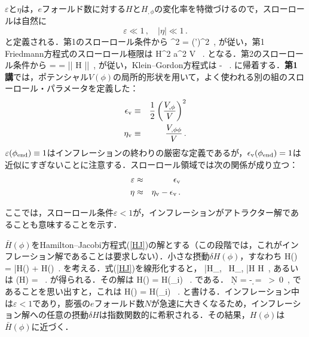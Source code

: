$\varepsilon$と$\eta$は，$e$フォールド数に対する$H$と$H_{,\phi}$の変化率を特徴づけるので，スローロールは自然に
\begin{equation}
\varepsilon \ll 1\, , \quad 
|\eta| \ll 1 \, .
\end{equation}
と定義される．第1のスローロール条件から
\beq
\varepsilon {} \qquad \Rightarrow {}^2 =   \gg (\phi')^2\, ,
\eeq
が従い，第1 Friedmann方程式のスローロール極限は
\beq
{\cal H}^2 \approx {} a^2 V \, .
\eeq
となる．第2のスローロール条件から
\beq
\eta = \frac{d \ln |\dot\phi|]}{d N} =    \quad \quad \Rightarrow \quad \quad |\ddot \phi | \ll H |\dot \phi |\, ,
\eeq
が従い，Klein--Gordon方程式は
\beq
\dot{\phi} \approx - \, .
\eeq
に帰着する．\textbf{第1講}では，ポテンシャル$V(\phi)$の局所的形状を用いて，よく使われる別の組のスローロール・パラメータを定義した：
\begin{eqnarray}
\epsilon_{\rm v} &\equiv& \frac{1}{2} \left(\frac{V_{,\phi}}{V}\right)^2\\
\eta_{\rm v} &\equiv& \frac{V_{,\phi \phi}}{V}\, .
\end{eqnarray}
$\varepsilon(\phi_{\rm end}) \equiv 1$はインフレーションの終わりの厳密な定義であるが，$\epsilon_{\rm v}(\phi_{\rm end}) =1$は近似にすぎないことに注意する．スローロール領域では次の関係が成り立つ：
\begin{eqnarray}
\varepsilon &\approx& \epsilon_{\rm v} \\
\eta &\approx& \eta_{\rm v} - \epsilon_{\rm v}\, .
\end{eqnarray}





ここでは，スローロール条件$\varepsilon < 1$が，インフレーションがアトラクター解であることも意味することを示す．



$\bar H(\phi)$をHamilton--Jacobi方程式(\ref{HJ})の解とする（この段階では，これがインフレーション解であることは要求しない）．小さな摂動$\delta H(\phi)$，すなわち
\beq
H(\phi) = \bar H(\phi) + \delta H(\phi)\, .
\eeq
を考える．式(\ref{HJ})を線形化すると，
\beq
\bar H_{, \phi}\, \delta H_{,\phi} \approx {} \bar H \delta H\, ,
\eeq
あるいは
\beq
{} (\ln \delta H) =  \, .
\eeq
が得られる．その解は
\beq
\delta H(\phi) = \delta H(\phi_{\rm i}) \exp {}\, .
\eeq
である．
\beq
\d N = -   \d \phi = \frac{| \d \phi|}{\sqrt{2 \varepsilon}} \ >\ 0\, ,
\eeq
であることを思い出すと，これは
\beq
\delta H(\phi) = \delta H(\phi_i) \exp \left[ -3 (N-N_i) \right]\, .
\eeq
と書ける．インフレーション中は$\varepsilon < 1$であり，膨張の$e$フォールド数$N$が急速に大きくなるため，インフレーション解への任意の摂動$\delta H$は指数関数的に希釈される．その結果，$H(\phi)$は$\bar H(\phi)$に近づく．


%
